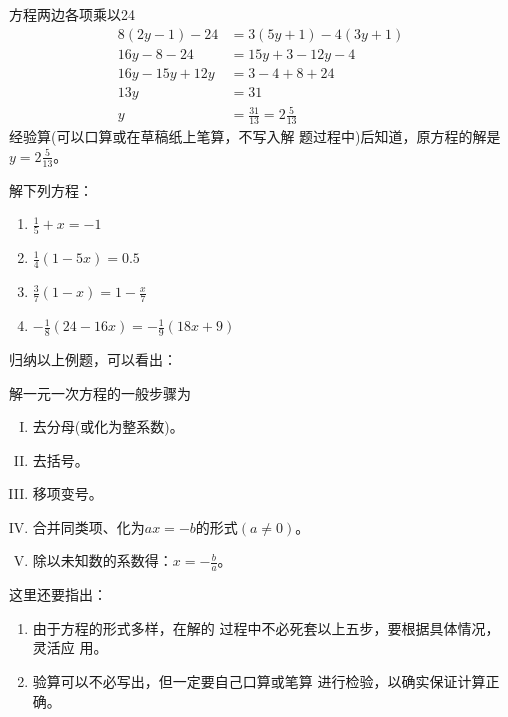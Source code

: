 \begin{solution}
    方程两边各项乘以24
 \begin{align*}
    8 (2y-1)-24&=3 (5y+1)-4 (3y+1)  \tag{去分母}\\
    16y-8-24&=15y + 3-12y-4  \tag{去括号}\\
    16y-15y+12y&=3-4+8+24  \tag{移项}\\
    13y&=31    \tag{合并同类项}\\
    y&=\frac{31}{13}=2\frac{5}{13} \tag{两边除以13}
 \end{align*}   
 经验算(可以口算或在草稿纸上笔算，不写入解
 题过程中)后知道，原方程的解是$y=2\frac{5}{13}$。
\end{solution}

\begin{ex}
解下列方程：
\begin{multicols}{2}
\begin{enumerate}
    \item $\frac{1}{5}+x=-1$
    \item $\frac{1}{4}(1-5x)=0.5$
    \item $\frac{3}{7}(1-x)=1-\frac{x}{7}$
    \item $-\frac{1}{8}(24-16x)=-\frac{1}{9}(18x+9)$
\end{enumerate}
\end{multicols}
\end{ex}

归纳以上例题，可以看出：
\begin{blk}{}
    解一元一次方程的一般步骤为
    \begin{enumerate}[I.]
        \item 去分母(或化为整系数)。
        \item 去括号。
        \item 移项变号。
        \item 合并同类项、化为$ax=-b$的形式$(a\ne 0)$。
        \item 除以未知数的系数得：$x=-\frac{b}{a}$。
    \end{enumerate}
\end{blk}
      
这里还要指出：
\begin{enumerate}
    \item 由于方程的形式多样，在解的
过程中不必死套以上五步，要根据具体情况，灵活应
用。
\item 验算可以不必写出，但一定要自己口算或笔算
进行检验，以确实保证计算正确。
\end{enumerate}

